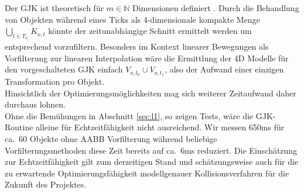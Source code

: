 Der GJK ist theoretisch für $m\in\mathbb{N}$ Dimensionen definiert \cite{gjk}. Durch die Behandlung von Objekten während eines Ticks als 4-dimensionale kompakte Menge $\bigcup_{t \in \Upsilon_{\delta_i}} K_{o,t}$ könnte der zeitunabhängige Schnitt ermittelt werden um entsprechend vorzufiltern. Besonders im Kontext linearer Bewegungen als Vorfilterung zur linearen Interpolation wäre die Ermittlung der 4D Modelle für den vorgeschalteten GJK einfach $V_{o, t_0} \cup V_{o, t_1}$, also der Aufwand einer einzigen Transformation pro Objekt.\\

Hinsichtlich der Optimierungsmöglichkeiten mag sich weiterer Zeitaufwand daher durchaus lohnen.\\

Ohne die Bemühungen in Abschnitt \ref{sec:l1}, so zeigen Tests, wäre die GJK-Routine alleine für Echtzeitfähigkeit nicht ausreichend. Wir messen 650ms für ca.~60 Objekte ohne AABB Vorfilterung während beliebige Vorfilterungsmethoden diese Zeit bereits auf ca.~6ms reduziert. Die Einschätzung zur Echtzeitfähigkeit gilt zum derzeitigen Stand und schätzungsweise auch für die zu erwartende Optimierungsfähigkeit modellgenauer Kollisionsverfahren für die Zukunft des Projektes.